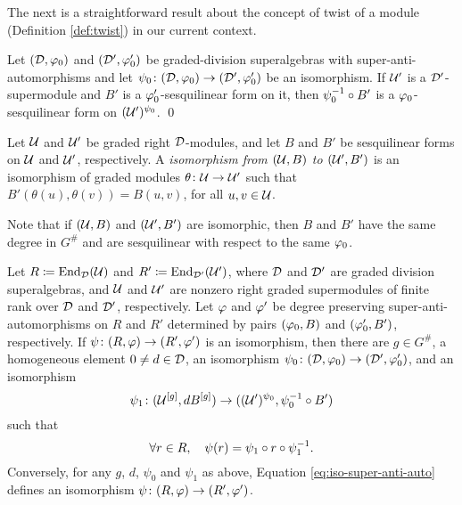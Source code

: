 The next is a straightforward result about the concept of twist of a module (Definition \ref{def:twist}) in our current context.

\begin{lemma}
    Let $(\mathcal{D}, \varphi_0)$ and $(\mathcal{D}', \varphi_0')$ be graded-division superalgebras with super-anti-automorphisms and let $\psi_0 \colon (\mathcal{D}, \varphi_0) \to (\mathcal{D}', \varphi_0')$ be an isomorphism. 
    If $\mathcal U'$ is a $\mathcal{D}'$-supermodule and $B'$ is a $\varphi_0'$-sesquilinear form on it, then $\psi_0^{-1} \circ B'$ is a $\varphi_0$-sesquilinear form on $(\mathcal U')^{\psi_0}$. \qed
\end{lemma}

\begin{defi}\label{def:iso-(U,B)}
    Let $\mathcal U$ and $\mathcal U'$ be graded right $\mathcal{D}$-modules, and let $B$ and $B'$ be sesquilinear forms on $\mathcal U$ and $\mathcal U'$, respectively. 
    A \emph{isomorphism from $(\mathcal U, B)$ to $(\mathcal U', B')$} is an isomorphism of graded modules $\theta\colon \mathcal U \to \mathcal U'$ such that $B'( \theta(u), \theta(v) ) = B(u, v)$, for all $u,v \in \mathcal U$.
\end{defi}

Note that if $(\mathcal U, B)$ and $(\mathcal U', B')$ are isomorphic, then $B$ and $B'$ have the same degree in $G^\#$ and are sesquilinear with respect to the same $\varphi_0$. 


\begin{thm}\label{thm:iso-abstract-vphi}
    Let $R \coloneqq \operatorname{End}_{\mathcal{D}}(\mathcal U)$ and $R' \coloneqq \operatorname{End}_{\mathcal{D}'}(\mathcal U')$, where $\mathcal{D}$ and $\mathcal{D}'$ are graded division superalgebras, and $\mathcal U$ and $\mathcal U'$ are nonzero right graded supermodules of finite rank over $\mathcal{D}$ and $\mathcal{D}'$, respectively. 
    Let $\varphi$ and $\varphi'$ be degree preserving super-anti-automorphisms on $R$ and $R'$ determined by pairs $(\varphi_0, B)$ and $(\varphi_0', B')$, respectively. 
    If $\psi\colon (R, \varphi) \to (R', \varphi')$ is an isomorphism, then there are $g\in G^\#$, a homogeneous element $0\neq d\in \mathcal{D}$, an isomorphism $\psi_0\colon (\mathcal{D}, \varphi_0) \to (\mathcal{D}', \varphi_0')$, and an isomorphism
    \begin{equation}\label{eq:iso-B-implies-vphi}
        \psi_1 \colon (\mathcal U^{[g]}, dB^{[g]}) \to ( (\mathcal U')^{\psi_0}, \psi_0^{-1} \circ B' ) 
    \end{equation}
    such that 
    \begin{equation}\label{eq:iso-super-anti-auto}
        \forall r\in R, \quad \psi(r) = \psi_1 \circ r \circ \psi_1^{-1}.
    \end{equation}
    Conversely, for any $g$, $d$, $\psi_0$ and $\psi_1$ as above, 
    Equation \eqref{eq:iso-super-anti-auto}
    defines an isomorphism $\psi \colon (R, \varphi) \to (R', \varphi')$.
\end{thm}

